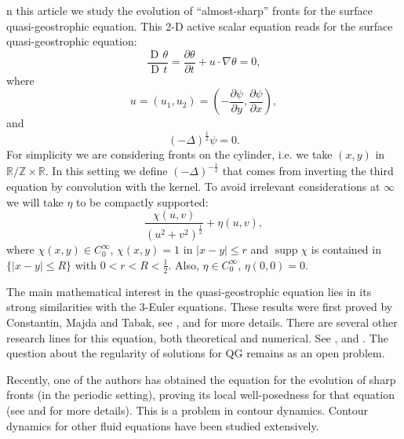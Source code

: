 \documentclass{pnas}
\DeclareMathOperator{\supp}{\mathrm{supp}}
\DeclareMathOperator{\Dif}{\mathrm{D}\!}
\begin{document}

n this article we study the evolution of ``almost-sharp'' fronts for the surface quasi-geostrophic equation.
This 2-D active scalar equation reads for the surface quasi-geostrophic equation:
\begin{equation}
\frac{\Dif{θ}}{\Dif{t}} = \frac{∂θ}{∂t} + u · ∇θ = 0, \label{qg1}
\end{equation}
where
\begin{equation}
u = (u_1, u_2) = \left( -\frac{∂ψ}{∂y}, \frac{∂ψ}{∂x} \right), \label{qg2}
\end{equation}
and
\begin{equation}
(-Δ)^{\frac{1}{2}} ψ = 0. \label{qg3}
\end{equation}
For simplicity we are considering fronts on the cylinder, i.e. we take \( (x, y) \) in \( \mathbb{R} / \mathbb{Z} × \mathbb{R} \).
In this setting we define \( (-Δ)^{-\frac{1}{2}} \) that comes from inverting the third equation by convolution with the kernel.
To avoid irrelevant considerations at \( ∞ \) we will take \( η \) to be compactly supported:
\begin{equation*}
\frac{χ(u, v)}{(u^2 + v^2)^{\frac{1}{2}}} + η(u, v),
\end{equation*}
where \( χ(x, y) ∈ C_0^∞ \), \( χ(x, y) = 1 \) in \( |x - y| ≤ r \) and \( \supp{χ} \) is contained in \( \{|x - y| ≤ R\} \) with \( 0 < r < R < \frac{1}{2} \).
Also, \( η ∈ C_0^∞ \), \( η(0, 0) = 0 \).

The main mathematical interest in the quasi-geostrophic equation lies in its strong similarities with the 3-Euler equations.
These results were first proved by Constantin, Majda and Tabak, see \cite{kadison1959}, \cite{anderson1981} and \cite{anderson1979} for more details.
There are several other research lines for this equation, both theoretical and numerical.
See \cite{anderson1979b}, \cite{johnson1972} and \cite{akemann2004}.
The question about the regularity of solutions for QG remains as an open problem.

Recently, one of the authors has obtained the equation for the evolution of sharp fronts (in the periodic setting), proving its local well-posedness for that equation (see \cite{zhang2002} and \cite{tenenbaum2000} for more details).
This is a problem in contour dynamics.
Contour dynamics for other fluid equations have been studied extensively.
\end{document}
